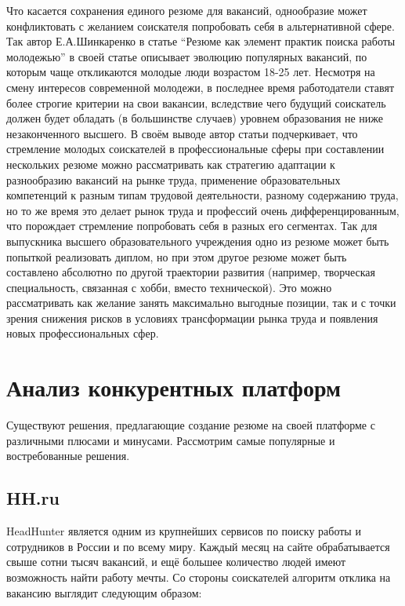 \documentclass[master, och, pract]{SCWorks}
\begin{document}
Что касается сохранения единого резюме для вакансий, однообразие может 
конфликтовать с желанием соискателя попробовать себя в альтернативной сфере. 
Так автор Е.А.Шинкаренко в статье “Резюме как элемент практик поиска работы молодежью” 
в своей статье описывает эволюцию популярных вакансий, по которым чаще откликаются 
молодые люди возрастом 18-25 лет. Несмотря на смену интересов современной молодежи, 
в последнее время работодатели ставят более строгие критерии на свои вакансии, 
вследствие чего будущий соискатель должен будет обладать (в большинстве случаев) 
уровнем образования не ниже незаконченного высшего. В своём выводе автор статьи 
подчеркивает, что стремление молодых соискателей в профессиональные сферы при 
составлении нескольких резюме можно рассматривать как стратегию адаптации к разнообразию 
вакансий на рынке труда, применение образовательных компетенций к разным типам 
трудовой деятельности, разному содержанию труда, но то же время это делает рынок 
труда и профессий очень дифференцированным, что порождает стремление попробовать 
себя в разных его сегментах. Так для выпускника высшего образовательного 
учреждения одно из резюме может быть попыткой реализовать диплом, но при этом 
другое резюме может быть составлено абсолютно по другой траектории развития 
(например, творческая специальность, связанная с хобби, вместо технической). 
Это можно рассматривать как желание занять максимально выгодные позиции, 
так и с точки зрения снижения рисков в условиях трансформации рынка труда 
и появления новых профессиональных сфер.


\section{Анализ конкурентных платформ}
Существуют решения, предлагающие создание резюме на своей платформе с
различными плюсами и минусами. Рассмотрим самые популярные и востребованные решения.

\subsection{HH.ru}
HeadHunter является одним из крупнейших сервисов по поиску работы и сотрудников в России 
и по всему миру. Каждый месяц на сайте обрабатывается свыше сотни тысяч вакансий, 
и ещё большее количество людей имеют возможность найти работу мечты. 
Со стороны соискателей алгоритм отклика на вакансию выглядит следующим образом:
\end{document}
